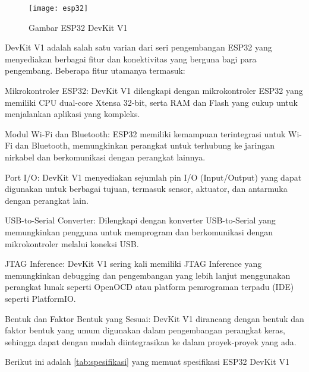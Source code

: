 \begin{figure}[H]
	\centering
	\texttt{[image: esp32]}
	\caption{Gambar ESP32 DevKit V1}
	\label{fig:ESP}
\end{figure}

DevKit V1 adalah salah satu varian dari seri pengembangan ESP32 yang menyediakan berbagai fitur dan konektivitas yang berguna bagi para pengembang. Beberapa fitur utamanya termasuk:
\begin{packed_item}
	\item Mikrokontroler ESP32: DevKit V1 dilengkapi dengan mikrokontroler ESP32 yang memiliki CPU dual-core Xtensa 32-bit, serta RAM dan Flash yang cukup untuk menjalankan aplikasi yang kompleks.
	\item Modul Wi-Fi dan Bluetooth: ESP32 memiliki kemampuan terintegrasi untuk Wi-Fi dan Bluetooth, memungkinkan perangkat untuk terhubung ke jaringan nirkabel dan berkomunikasi dengan perangkat lainnya.
	\item Port I/O: DevKit V1 menyediakan sejumlah pin I/O (Input/Output) yang dapat digunakan untuk berbagai tujuan, termasuk sensor, aktuator, dan antarmuka dengan perangkat lain.
	\item USB-to-Serial Converter: Dilengkapi dengan konverter USB-to-Serial yang memungkinkan pengguna untuk memprogram dan berkomunikasi dengan mikrokontroler melalui koneksi USB.
	\item JTAG Inference: DevKit V1 sering kali memiliki  JTAG Inference yang memungkinkan debugging dan pengembangan yang lebih lanjut menggunakan perangkat lunak seperti OpenOCD atau platform pemrograman terpadu (IDE) seperti PlatformIO.
	\item Bentuk dan Faktor Bentuk yang Sesuai: DevKit V1 dirancang dengan bentuk dan faktor bentuk yang umum digunakan dalam pengembangan perangkat keras, sehingga dapat dengan mudah diintegrasikan ke dalam proyek-proyek yang ada.
\end{packed_item}

Berikut ini adalah \cref{tab:spesifikasi} yang memuat spesifikasi ESP32 DevKit V1

